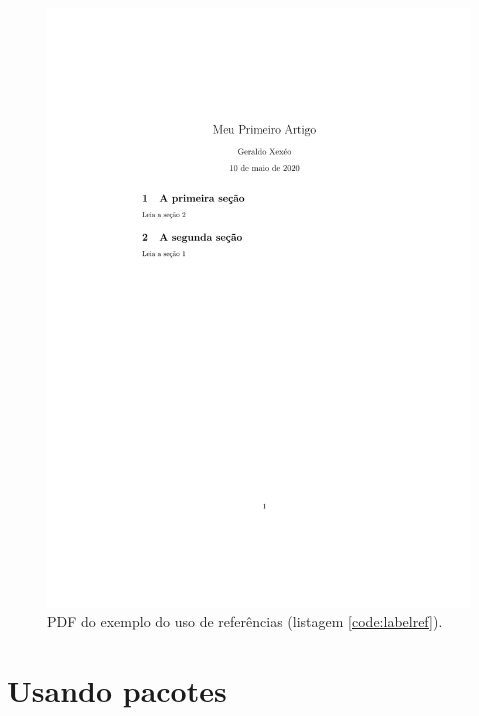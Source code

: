 

\begin{figure}
    \centering
    \includegraphics[height=.4\textheight,frame,
    clip,trim= 4.5cm  11cm 4cm 5cm]{labelref}
    \caption{PDF do exemplo do uso de referências (listagem \ref{code:labelref}).}
    \label{fig:labelref}
\end{figure}

\section{Usando pacotes}


